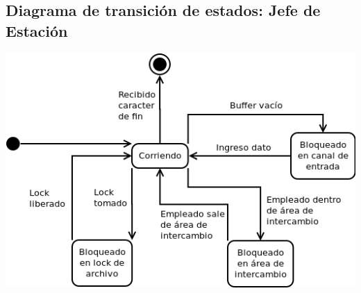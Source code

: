 \documentclass{article}
\begin{document}
\subsection{Diagrama de transición de estados: Jefe de Estación}
\includegraphics[width=\textwidth]{diagramaTransicionEstadosJefe}
\end{document}

